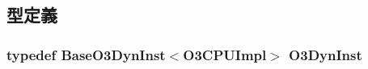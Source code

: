 \subsection{型定義}
\hypertarget{cpu_2static__inst_8hh_a091350ae6b1111b92f9a1174c552188f}{
\subsubsection[{O3DynInst}]{\setlength{\rightskip}{0pt plus 5cm}typedef {\bf BaseO3DynInst}$<${\bf O3CPUImpl}$>$ {\bf O3DynInst}}}
\label{cpu_2static__inst_8hh_a091350ae6b1111b92f9a1174c552188f}

